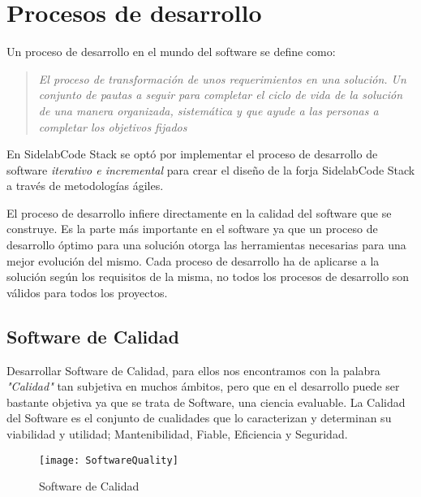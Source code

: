 \chapter{Procesos de desarrollo}
\label{chap:procesos-desarrollo}

\par Un proceso de desarrollo en el mundo del software se define como:

\begin{quote}
\emph{El proceso de transformación de unos requerimientos en una solución. Un conjunto de pautas a seguir para completar el ciclo de vida de la solución de una manera organizada, sistemática y que ayude a las personas a completar los objetivos fijados}
\end{quote}

\par En SidelabCode Stack se optó por implementar el proceso de desarrollo de software \emph{iterativo e incremental} para crear el dise\~no de la forja SidelabCode Stack a través de metodolog\'ias ágiles.

\par El proceso de desarrollo infiere directamente en la calidad del software que se construye. Es la parte más importante en el software ya que un proceso de desarrollo óptimo para una solución otorga las herramientas necesarias para una mejor evolución del mismo. Cada proceso de desarrollo ha de aplicarse a la solución según los requisitos de la misma, no todos los procesos de desarrollo son válidos para todos los proyectos.

\section{Software de Calidad}
\label{sec:software-calidad}

\par Desarrollar Software de Calidad, para ellos nos encontramos con la palabra \emph{"Calidad"} tan subjetiva en muchos ámbitos, pero que en el desarrollo puede ser bastante objetiva ya que se trata de Software, una ciencia evaluable. La Calidad del Software es el conjunto de cualidades que lo caracterizan y determinan su viabilidad y utilidad; Mantenibilidad, Fiable, Eficiencia y Seguridad.

\begin{figure}[H]
    \begin{center}	
        \texttt{[image: SoftwareQuality]}
        \caption{Software de Calidad}
        \label{fig:softwarequality}
    \end{center}
\end{figure}

